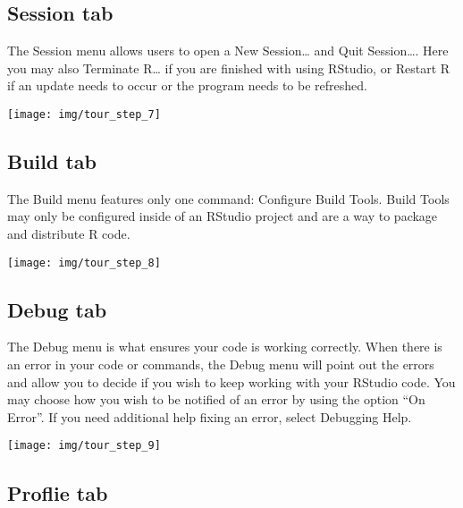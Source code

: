 \documentclass[
]{book}
\begin{document}
\hypertarget{session-tab}{%
\subsection{Session tab}\label{session-tab}}

The Session menu allows users to open a New Session\ldots{} and Quit Session\ldots. Here you may also Terminate R\ldots{} if you are finished with using RStudio, or Restart R if an update needs to occur or the program needs to be refreshed.

\begin{center}\texttt{[image: img/tour\_step\_7]} \end{center}

\hypertarget{build-tab}{%
\subsection{Build tab}\label{build-tab}}

The Build menu features only one command: Configure Build Tools. Build Tools may only be configured inside of an RStudio project and are a way to package and distribute R code.

\begin{center}\texttt{[image: img/tour\_step\_8]} \end{center}

\hypertarget{debug-tab}{%
\subsection{Debug tab}\label{debug-tab}}

The Debug menu is what ensures your code is working correctly. When there is an error in your code or commands, the Debug menu will point out the errors and allow you to decide if you wish to keep working with your RStudio code. You may choose how you wish to be notified of an error by using the option ``On Error''. If you need additional help fixing an error, select Debugging Help.

\begin{center}\texttt{[image: img/tour\_step\_9]} \end{center}

\hypertarget{proflie-tab}{%
\subsection{Proflie tab}\label{proflie-tab}}
\end{document}
